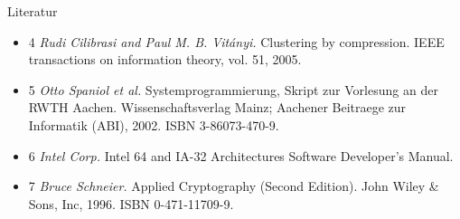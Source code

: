 \documentclass{beamer}
\newenvironment{itemizeframe}[1]
  {\begin{frame}{#1}\startitemizeframe}
  {\stopitemizeframe\end{frame}}
\newcommand\startitemizeframe{\begin{itemize}}
\newcommand\stopitemizeframe{\end{itemize}}
\begin{document}
	\begin{itemizeframe}{Literatur}
		\item[4] \emph{Rudi Cilibrasi and Paul M. B. Vit\'anyi.} Clustering by compression.
			IEEE transactions on information theory, vol. 51, 2005.

		\item[5] \emph{Otto Spaniol et al.} Systemprogrammierung, Skript zur Vorlesung an der RWTH
			Aachen. Wissenschaftsverlag Mainz; Aachener Beitraege zur Informatik (ABI),
			2002. ISBN 3-86073-470-9.
			
		\item[6] \emph{Intel Corp.} Intel 64 and IA-32 Architectures Software Developer’s Manual.

		\item[7] \emph{Bruce Schneier.} Applied Cryptography (Second Edition). John Wiley \& Sons,
			Inc, 1996. ISBN 0-471-11709-9.
	\end{itemizeframe}
\end{document}
